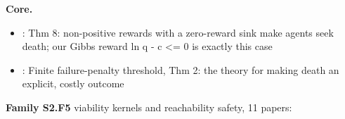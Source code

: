 \documentclass[10pt]{article}
\newcommand{\memb}[1]{\par\smallskip\textbf{#1}\quad}
\begin{document}
\memb{Core.}
\begin{itemize}[nosep,leftmargin=1.2em]
\item \citet{Martin-death16}: Thm 8: non-positive rewards with a zero-reward sink make agents seek death; our Gibbs reward ln q - c \textless{}= 0 is exactly this case
\item \citet{Massiani-safe23}: Finite failure-penalty threshold, Thm 2: the theory for making death an explicit, costly outcome
\end{itemize}
\memb{Family S2.F5} viability kernels and reachability safety, 11 papers: {\footnotesize \citetext{\citealp{Massiani-safe23}; \citealp{Abate-probabilistic08}; \citealp{Aubin-viability11}; \citealp{Fisac-bridging19}; \citealp{Heim-learnable19}; \citealp{SaintPierre-approximation94}; \citealp{Deffuant-approximating07}\dag; \citealp{Bansal-hamiltonjacobi17}; \citealp{Heim-learning18}; \citealp{Hsu-safety21}; \citealp{Tan-safe24}}}
\end{document}
